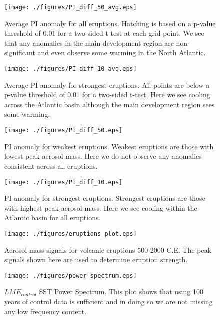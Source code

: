 \documentclass[smallextended]{svjour3}       %
\begin{document}
\begin{figure}[!tbp]
\centering
\texttt{[image: ./figures/PI\_diff\_50\_avg.eps]}
\caption{Average PI anomaly for all eruptions. Hatching is based on a p-value threshold of 0.01 for a two-sided t-test at each grid point. We see that any anomalies in the main development region are non-significant and even observe some warming in the North Atlantic.}
\label{pi_all_avg}
\end{figure}

\begin{figure}[!tbp]
\centering
\texttt{[image: ./figures/PI\_diff\_10\_avg.eps]}
\caption{Average PI anomaly for strongest eruptions. All points are below a p-value threshold of 0.01 for a two-sided t-test. Here we see cooling across the Atlantic basin although the main development region sees some warming.}
\label{pi_10_avg}
\end{figure}

\begin{figure}[!tbp]
\centering
\texttt{[image: ./figures/PI\_diff\_50.eps]}
\caption{PI anomaly for weakest eruptions. Weakest eruptions are those with lowest peak aerosol mass. Here we do not observe any anomalies consistent across all eruptions.}
\label{pi_10_wk}
\end{figure}

\begin{figure}[!tbp]
\centering
\texttt{[image: ./figures/PI\_diff\_10.eps]}
\caption{PI anomaly for strongest eruptions. Strongest eruptions are those with highest peak aerosol mass. Here we see cooling within the Atlantic basin for all eruptions.}
\label{pi_10_str}
\end{figure}

\begin{figure}[!tbp]
\centering
\begin{minipage}[b]{0.45\textwidth}
\texttt{[image: ./figures/eruptions\_plot.eps]}
\caption{Aerosol mass signals for volcanic eruptions 500-2000 C.E. The peak signals shown here are used to determine eruption strength. }
\label{erups_plot}
\end{minipage}
\hfill
\begin{minipage}[b]{0.45\textwidth}
\texttt{[image: ./figures/power\_spectrum.eps]}
\caption{$LME_{control}$ SST Power Spectrum. This plot shows that using 100 years of control data is sufficient and in doing so we are not missing any low frequency content.}
\label{spectrum}
\end{minipage}
\end{figure}
\end{document}
